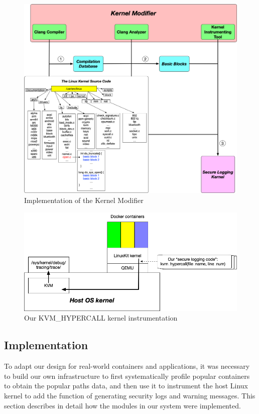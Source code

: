 \begin{figure}
\centering
\includegraphics[width=1.5\columnwidth]{diagram/linuxkit-kernel-modifier.png}
\caption{\small Implementation of the Kernel Modifier}
\label{fig:linuxkit-kernel-modifier}
\end{figure}

\begin{figure}
\centering
\includegraphics[width=1.5\columnwidth]{diagram/kvm_hypercall.png}
\caption{\small Our KVM\_HYPERCALL kernel instrumentation}
\label{fig:kvm_hypercall}
\end{figure}

\subsection{Implementation}
\label{sec.design.implementation}
To adapt our design for real-world containers and applications, it was necessary to build our own infrastructure to first systematically profile popular containers to obtain the popular paths data, and then use it to instrument the host Linux kernel to add the function of generating security logs and warning messages.  
This section describes in detail how the modules in our system were implemented.

